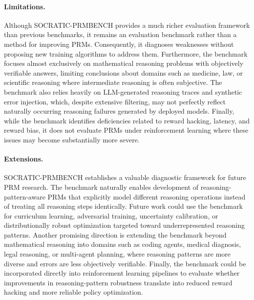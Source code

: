 \documentclass[11pt]{article}
\begin{document}
\paragraph{Limitations.}
Although SOCRATIC-PRMBENCH provides a much richer evaluation framework than previous benchmarks, it remains an evaluation benchmark rather than a method for improving PRMs. Consequently, it diagnoses weaknesses without proposing new training algorithms to address them. Furthermore, the benchmark focuses almost exclusively on mathematical reasoning problems with objectively verifiable answers, limiting conclusions about domains such as medicine, law, or scientific reasoning where intermediate reasoning is often subjective. The benchmark also relies heavily on LLM-generated reasoning traces and synthetic error injection, which, despite extensive filtering, may not perfectly reflect naturally occurring reasoning failures generated by deployed models. Finally, while the benchmark identifies deficiencies related to reward hacking, latency, and reward bias, it does not evaluate PRMs under reinforcement learning where these issues may become substantially more severe.  

\paragraph{Extensions.}
SOCRATIC-PRMBENCH establishes a valuable diagnostic framework for future PRM research. The benchmark naturally enables development of reasoning-pattern-aware PRMs that explicitly model different reasoning operations instead of treating all reasoning steps identically. Future work could use the benchmark for curriculum learning, adversarial training, uncertainty calibration, or distributionally robust optimization targeted toward underrepresented reasoning patterns. Another promising direction is extending the benchmark beyond mathematical reasoning into domains such as coding agents, medical diagnosis, legal reasoning, or multi-agent planning, where reasoning patterns are more diverse and errors are less objectively verifiable. Finally, the benchmark could be incorporated directly into reinforcement learning pipelines to evaluate whether improvements in reasoning-pattern robustness translate into reduced reward hacking and more reliable policy optimization.
\end{document}

